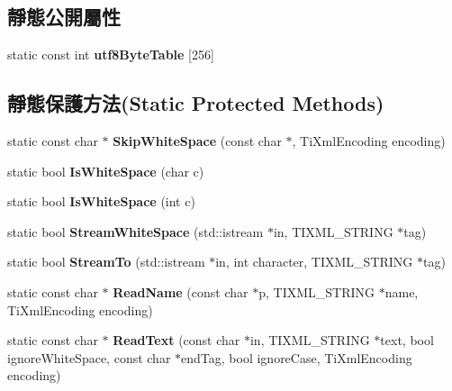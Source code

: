 \subsection*{靜態公開屬性}
\begin{DoxyCompactItemize}
\item 
static const int {\bfseries utf8\+Byte\+Table} \mbox{[}256\mbox{]}
\end{DoxyCompactItemize}
\subsection*{靜態保護方法(Static Protected Methods)}
\begin{DoxyCompactItemize}
\item 
static const char $\ast$ {\bfseries Skip\+White\+Space} (const char $\ast$, Ti\+Xml\+Encoding encoding)\hypertarget{class_ti_xml_base_ac0c3d66d8a9e6996a1fa016275e16875}{}\label{class_ti_xml_base_ac0c3d66d8a9e6996a1fa016275e16875}

\item 
static bool {\bfseries Is\+White\+Space} (char c)\hypertarget{class_ti_xml_base_af56296d561c0bab4bc8e198cdcf5c48e}{}\label{class_ti_xml_base_af56296d561c0bab4bc8e198cdcf5c48e}

\item 
static bool {\bfseries Is\+White\+Space} (int c)\hypertarget{class_ti_xml_base_a3de391ea9f4c4a8aa10d04480b048795}{}\label{class_ti_xml_base_a3de391ea9f4c4a8aa10d04480b048795}

\item 
static bool {\bfseries Stream\+White\+Space} (std\+::istream $\ast$in, T\+I\+X\+M\+L\+\_\+\+S\+T\+R\+I\+NG $\ast$tag)\hypertarget{class_ti_xml_base_a189eaa418ff6628bdabf4bf8fb1bd633}{}\label{class_ti_xml_base_a189eaa418ff6628bdabf4bf8fb1bd633}

\item 
static bool {\bfseries Stream\+To} (std\+::istream $\ast$in, int character, T\+I\+X\+M\+L\+\_\+\+S\+T\+R\+I\+NG $\ast$tag)\hypertarget{class_ti_xml_base_aae465f424a9bcf7a9cf2426c62da8e6b}{}\label{class_ti_xml_base_aae465f424a9bcf7a9cf2426c62da8e6b}

\item 
static const char $\ast$ {\bfseries Read\+Name} (const char $\ast$p, T\+I\+X\+M\+L\+\_\+\+S\+T\+R\+I\+NG $\ast$name, Ti\+Xml\+Encoding encoding)\hypertarget{class_ti_xml_base_a1c21a6ab5f7b503acd91f35f183734b3}{}\label{class_ti_xml_base_a1c21a6ab5f7b503acd91f35f183734b3}

\item 
static const char $\ast$ {\bfseries Read\+Text} (const char $\ast$in, T\+I\+X\+M\+L\+\_\+\+S\+T\+R\+I\+NG $\ast$text, bool ignore\+White\+Space, const char $\ast$end\+Tag, bool ignore\+Case, Ti\+Xml\+Encoding encoding)\hypertarget{class_ti_xml_base_aa646c74921aa33156968b802bbf5566e}{}\label{class_ti_xml_base_aa646c74921aa33156968b802bbf5566e}


\end{DoxyCompactItemize}
